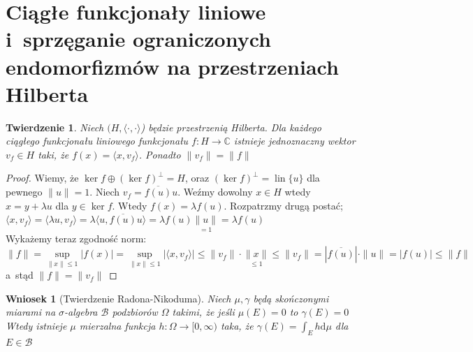 \documentclass[11pt]{mwrep}
\renewcommand{\[}{\begin{equation}}
\renewcommand{\]}{\end{equation}}
\newcommand{\C}{{\ensuremath{\mathbb C}}}
\newcommand{\lin}{\operatorname{lin}}
\newcommand{\dd}{\mathrm{d}}
\newcommand{\scal}{\langle \cdot,\cdot \rangle}
\newtheorem{twr}[subsection]{Twierdzenie}%
\newtheorem{wn}[subsection]{Wniosek}
\begin{document}
\section{Ciągłe funkcjonały liniowe i~sprzęganie ograniczonych endomorfizmów na przestrzeniach Hilberta}
\begin{twr}
	\label{tw241}
	Niech $(H, \scal $) będzie przestrzenią Hilberta. Dla każdego ciągłego funkcjonału liniowego funkcjonału $f\colon H \to \C$
	istnieje jednoznaczny wektor $v_f \in H$ taki, że $f(x) = \langle x,v_f \rangle$. Ponadto $\|v_f\| = \|f\|$ 
\end{twr}
\begin{proof}
	Wiemy, że $\ker f \oplus (\ker f)^\perp  =H$, oraz $(\ker f)^\perp = \lin\{u\}$ dla pewnego $\|u\|=1$.
	Niech $v_f = \overline{f(u)} u$.
	Weźmy dowolny $x\in H$ wtedy $x= y+\lambda u$  dla $y\in \ker f$. Wtedy $f(x) = \lambda f(u)$. Rozpatrzmy drugą postać;
	$\langle x, v_f  \rangle = \langle \lambda u , v_f \rangle = \lambda\langle u, \overline{f(u)} u  \rangle = \lambda f(u) \underset{=1}{\|u\|} = \lambda f(u)$\\
	Wykażemy teraz zgodność norm:
	$$\|f\| = \sup_{\|x\|\le 1} |f(x)| = \sup_{\|x\|\le 1} |\langle x,v_f \rangle| \le \|v_f\|\cdot \underset{\le 1}{\|x\|} \le \|v_f\| = 
	|\overline{f(u)}|\cdot \|u\| = |f(u)| \le \|f\|$$
	a~stąd $\|f\| = \|v_f\|$

\end{proof}
\begin{wn}[Twierdzenie Radona-Nikoduma]
	Niech $\mu, \gamma$ będą skończonymi  miarami na $\sigma$-algebra $\mathcal{B}$ podzbiorów $\Omega$ takimi, że jeśli $\mu(E) = 0$ to $\gamma(E) = 0$
	Wtedy istnieje $\mu$ mierzalna funkcja $h\colon \Omega\to [0,\infty)$ taka, że $\gamma(E) = \int_E h \dd \mu$ dla $E\in \mathcal{B}$ 
\end{wn}
\end{document}
